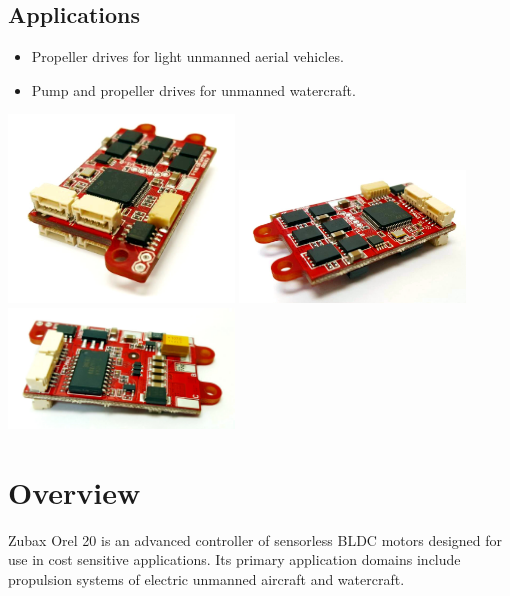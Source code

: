 \documentclass{zubaxdoc}
\begin{document}
\begin{titlepage}
\BeginRightColumn
\section*{Applications}

\begin{itemize}
    \item Propeller drives for light unmanned aerial vehicles.
    \item Pump and propeller drives for un\-man\-ned wa\-ter\-craft.
\end{itemize}

\centering
\includegraphics[width=0.45\textwidth]{image}
\includegraphics[width=0.45\textwidth]{image2}
\includegraphics[width=0.45\textwidth]{bottom}

\end{titlepage}

\tableofcontents
\BeginRightColumn
\listoffigures
\listoftables

\mainmatter

\chapter{Overview}

Zubax Orel 20 is an advanced controller of sensorless BLDC motors designed for use in
cost sensitive applications.
Its primary application domains include propulsion systems of electric unmanned aircraft
and watercraft.
\end{document}
